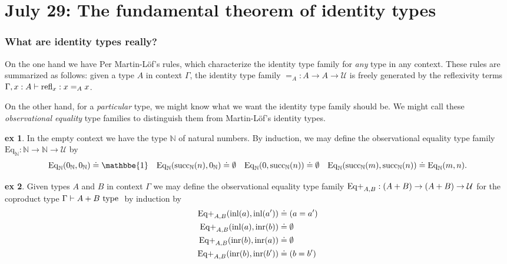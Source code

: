 \documentclass{amsart}
\theoremstyle{theorem}
\theoremstyle{definition}
\newtheorem*{ex}{ex}
\theoremstyle{remark}
\newcommand{\0}{\mathbbe{0}}
\newcommand{\1}{\mathbbe{1}}
\newcommand{\2}{\mathbbe{2}}
\newcommand{\3}{\mathbbe{3}}
\newcommand{\4}{\mathbbe{4}}
\newcommand{\univ}{{~\textup{type}~}}
\newcommand{\term}[1]{{\textup{#1}}}
\newcommand{\type}[1]{{\textup{#1}}}
\newcommand{\bN}{{\mathbb{N}}}
\newcommand{\suc}{\term{succ}_{\bN}}
\newcommand{\inl}{\term{inl}}
\newcommand{\inr}{\term{inr}}
\newcommand{\refl}{\term{refl}}
\newcommand{\UU}{{\mathcal{U}}}
\newcommand{\Eq}{\mathrm{Eq}}
\begin{document}
\address{Dept.~of Mathematics\\Johns Hopkins University\\3400 N Charles St\\Baltimore, MD 21218}

\maketitle

\setcounter{tocdepth}{1}
\tableofcontents

\part*{July 29: The fundamental theorem of identity types}

\section*{What are identity types really?}

On the one hand we have Per Martin-L\"{o}f's rules, which characterize the identity type family for \emph{any} type in any context. These rules are summarized as follows: given a type $A$ in context $\Gamma$, the identity type family $=_A : A \to A \to \UU$ is freely generated by the reflexivity terms $\Gamma, x : A \vdash \refl_x : x=_A x$.

On the other hand, for a \emph{particular} type, we might know what we want the identity type family should be. We might call these \emph{observational equality} type families to distinguish them from Martin-L\"{o}f's identity types.

\begin{ex} In the empty context we have the type $\bN$ of natural numbers. By induction, we may define the
observational equality type family $\Eq_\bN : \bN \to \bN \to \UU$ by
\[ \Eq_\bN(0_\bN,0_\bN) \doteq \1 \quad \Eq_\bN(\suc(n),0_\bN) \doteq \emptyset \quad \Eq_\bN(0,\suc(n)) \doteq \emptyset \quad \Eq_\bN(\suc(m), \suc(n)) \doteq \Eq_\bN(m,n).\]
\end{ex}

\begin{ex} Given types $A$ and $B$ in context $\Gamma$ we may define the observational equality type family $\type{Eq+}_{A,B} : (A+B) \to (A+B) \to \UU$ for the coproduct type $\Gamma \vdash A + B \univ$
by induction by
\begin{align*} \type{Eq+}_{A,B}(\inl(a),\inl(a')) &\doteq  (a = a')  \\ \type{Eq+}_{A,B}(\inl(a),\inr(b)) &\doteq \emptyset \\ \type{Eq+}_{A,B}(\inr(b),\inr(a)) &\doteq \emptyset \\ \type{Eq+}_{A,B} (\inr(b), \inr(b')) &\doteq (b = b')
\end{align*}
\end{ex}
\end{document}
